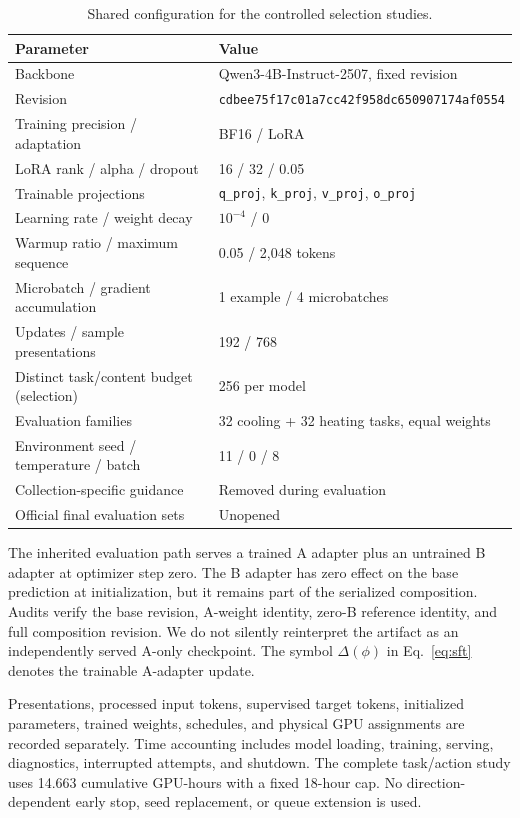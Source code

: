 \begin{table}[h]
\centering
\caption{Shared configuration for the controlled selection studies.}
\label{tab:config}
\small
\begin{tabular}{ll}
\toprule
Parameter & Value\\
\midrule
Backbone & Qwen3-4B-Instruct-2507, fixed revision\\
Revision & \texttt{cdbee75f17c01a7cc42f958dc650907174af0554}\\
Training precision / adaptation & BF16 / LoRA\\
LoRA rank / alpha / dropout & 16 / 32 / 0.05\\
Trainable projections & \texttt{q\_proj}, \texttt{k\_proj}, \texttt{v\_proj}, \texttt{o\_proj}\\
Learning rate / weight decay & $10^{-4}$ / 0\\
Warmup ratio / maximum sequence & 0.05 / 2,048 tokens\\
Microbatch / gradient accumulation & 1 example / 4 microbatches\\
Updates / sample presentations & 192 / 768\\
Distinct task/content budget (selection) & 256 per model\\
Evaluation families & 32 cooling + 32 heating tasks, equal weights\\
Environment seed / temperature / batch & 11 / 0 / 8\\
Collection-specific guidance & Removed during evaluation\\
Official final evaluation sets & Unopened\\
\bottomrule
\end{tabular}
\end{table}

The inherited evaluation path serves a trained A adapter plus an untrained B adapter at optimizer step zero. The B adapter has zero effect on the base prediction at initialization, but it remains part of the serialized composition. Audits verify the base revision, A-weight identity, zero-B reference identity, and full composition revision. We do not silently reinterpret the artifact as an independently served A-only checkpoint. The symbol $\Delta(\phi)$ in Eq.~\eqref{eq:sft} denotes the trainable A-adapter update.

Presentations, processed input tokens, supervised target tokens, initialized parameters, trained weights, schedules, and physical GPU assignments are recorded separately. Time accounting includes model loading, training, serving, diagnostics, interrupted attempts, and shutdown. The complete task/action study uses 14.663 cumulative GPU-hours with a fixed 18-hour cap. No direction-dependent early stop, seed replacement, or queue extension is used.

